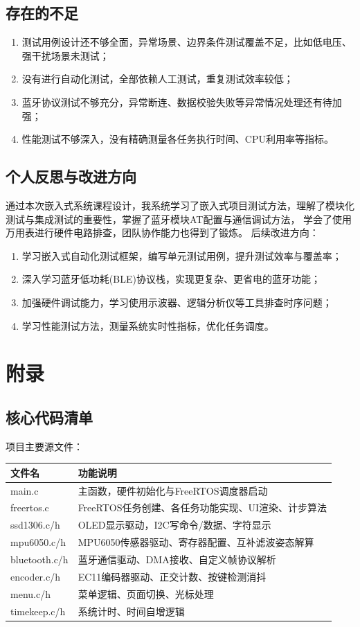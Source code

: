 \documentclass[12pt, a4paper]{ctexart}
\begin{document}
\subsection{存在的不足}
\begin{enumerate}
    \item 测试用例设计还不够全面，异常场景、边界条件测试覆盖不足，比如低电压、强干扰场景未测试；
    \item 没有进行自动化测试，全部依赖人工测试，重复测试效率较低；
    \item 蓝牙协议测试不够充分，异常断连、数据校验失败等异常情况处理还有待加强；
    \item 性能测试不够深入，没有精确测量各任务执行时间、CPU利用率等指标。
\end{enumerate}

\subsection{个人反思与改进方向}
通过本次嵌入式系统课程设计，我系统学习了嵌入式项目测试方法，理解了模块化测试与集成测试的重要性，掌握了蓝牙模块AT配置与通信调试方法，
学会了使用万用表进行硬件电路排查，团队协作能力也得到了锻炼。
后续改进方向：
\begin{enumerate}
    \item 学习嵌入式自动化测试框架，编写单元测试用例，提升测试效率与覆盖率；
    \item 深入学习蓝牙低功耗(BLE)协议栈，实现更复杂、更省电的蓝牙功能；
    \item 加强硬件调试能力，学习使用示波器、逻辑分析仪等工具排查时序问题；
    \item 学习性能测试方法，测量系统实时性指标，优化任务调度。
\end{enumerate}

\section{附录}
\subsection{核心代码清单}
项目主要源文件：
\begin{table}[htbp]
\centering
\begin{tabular}{ll}
\toprule
文件名 & 功能说明 \\
\midrule
main.c & 主函数，硬件初始化与FreeRTOS调度器启动 \\
freertos.c & FreeRTOS任务创建、各任务功能实现、UI渲染、计步算法 \\
ssd1306.c/h & OLED显示驱动，I2C写命令/数据、字符显示 \\
mpu6050.c/h & MPU6050传感器驱动、寄存器配置、互补滤波姿态解算 \\
bluetooth.c/h & 蓝牙通信驱动、DMA接收、自定义帧协议解析 \\
encoder.c/h & EC11编码器驱动、正交计数、按键检测消抖 \\
menu.c/h & 菜单逻辑、页面切换、光标处理 \\
timekeep.c/h & 系统计时、时间自增逻辑 \\
\bottomrule
\end{tabular}
\end{table}
\end{document}
